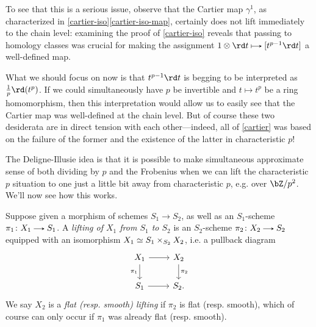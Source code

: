 To see that this is a serious issue, observe that the Cartier map $\gamma^1$, as characterized in \cref{cartier-iso}\cref{cartier-iso-map}, certainly does not lift immediately to the chain level: examining the proof of \cref{cartier-iso} reveals that passing to homology classes was crucial for making the assignment $1 \otimes \rd t \mapsto [t^{p-1} \rd t]$ a well-defined map.

What we should focus on now is that $t^{p-1} \rd t$ is begging to be interpreted as $\frac{1}{p} \rd(t^p)$. If we could simultaneously have $p$ be invertible and $t \mapsto t^p$ be a ring homomorphism, then this interpretation would allow us to easily see that the Cartier map was well-defined at the chain level. But of course these two desiderata are in direct tension with each other---indeed, all of \cref{cartier} was based on the failure of the former and the existence of the latter in characteristic $p$!

The Deligne-Illusie idea is that it is possible to make simultaneous approximate sense of both dividing by $p$ and the Frobenius when we can lift the characteristic $p$ situation to one just a little bit away from characteristic $p$, e.g. over $\bZ/p^2$. We'll now see how this works.

\begin{definition}
  \label{degenp-lift}
  Suppose given a morphism of schemes $S_1 \to S_2$, as well as an $S_1$-scheme $\pi_1 \c X_1 \to S_1$. A \emph{lifting of $X_1$ from $S_1$ to $S_2$} is an $S_2$-scheme $\pi_2 \c X_2 \to S_2$ equipped with an isomorphism $X_1 \simeq S_1 \times_{S_2} X_2$, i.e. a pullback diagram
  \[
    \begin{tikzcd}
      X_1 \ar[r] \ar[d, "\pi_1", swap] &
      X_2 \ar[d, "\pi_2"] \\
      S_1 \ar[r] &
      S_2.
    \end{tikzcd}
  \]
  We say $X_2$ is a \emph{flat (resp. smooth) lifting} if $\pi_2$ is flat (resp. smooth), which of course can only occur if $\pi_1$ was already flat (resp. smooth).
\end{definition}

